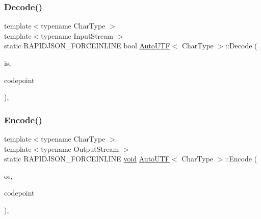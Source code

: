 \subsubsection{\texorpdfstring{Decode()}{Decode()}}
{\footnotesize\ttfamily template$<$typename Char\+Type $>$ \\
template$<$typename Input\+Stream $>$ \\
static R\+A\+P\+I\+D\+J\+S\+O\+N\+\_\+\+F\+O\+R\+C\+E\+I\+N\+L\+I\+NE bool \hyperlink{structAutoUTF}{Auto\+U\+TF}$<$ Char\+Type $>$\+::Decode (\begin{DoxyParamCaption}\item[{Input\+Stream \&}]{is,  }\item[{unsigned $\ast$}]{codepoint }\end{DoxyParamCaption})\hspace{0.3cm}{\ttfamily [inline]}, {\ttfamily [static]}}

\mbox{\label{structAutoUTF_a414946115261f886e74dd42cb4b98781}} 
\subsubsection{\texorpdfstring{Encode()}{Encode()}}
{\footnotesize\ttfamily template$<$typename Char\+Type $>$ \\
template$<$typename Output\+Stream $>$ \\
static R\+A\+P\+I\+D\+J\+S\+O\+N\+\_\+\+F\+O\+R\+C\+E\+I\+N\+L\+I\+NE \hyperlink{imgui__impl__opengl3__loader_8h_ac668e7cffd9e2e9cfee428b9b2f34fa7}{void} \hyperlink{structAutoUTF}{Auto\+U\+TF}$<$ Char\+Type $>$\+::Encode (\begin{DoxyParamCaption}\item[{Output\+Stream \&}]{os,  }\item[{unsigned}]{codepoint }\end{DoxyParamCaption})\hspace{0.3cm}{\ttfamily [inline]}, {\ttfamily [static]}}

\mbox{\label{structAutoUTF_a05f5dcd1f153b61b763e44ed452de251}} 
